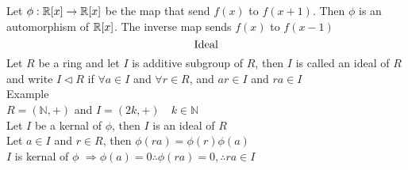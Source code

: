 \documentclass{book}
\newcommand{\polyringr}[2][R]{\mathbb{#1}\scalebox{1}[.95]{[}#2\scalebox{1}[.95]{]}}
\begin{document}
Let $\phi: \polyringr{x} \rightarrow  \polyringr{x}$ be the map that send $f(x)$ to $f(x+1)$. Then $\phi$ is an automorphism of $\polyringr{x}$.   
The inverse map sends $f(x)$ to $f(x-1)$\\

\[ \text{Ideal}\\ \]
Let $R$ be a ring and let $I$ is additive subgroup of $R$, then $I$ is called an ideal of $R$ and write $I \triangleleft R$ 
\quad if $\forall a \in I$ and $\forall r \in R $, and $ ar \in I$ and $ra \in I$\\

Example\\
$R = (\mathbb{N}, +)$ and $I = (2k, +) \quad k \in \mathbb{N}$\\

Let $I$ be a kernal of $\phi$, then $I$ is an ideal of $R$\\
Let $a \in I$ and $r \in R$, then $\phi(ra) = \phi(r)\phi(a)$\\
$I$ is kernal of $\phi$ $\Rightarrow \phi(a) = 0 \therefore \phi(ra) = 0, \therefore ra \in I$\\
\end{document}
